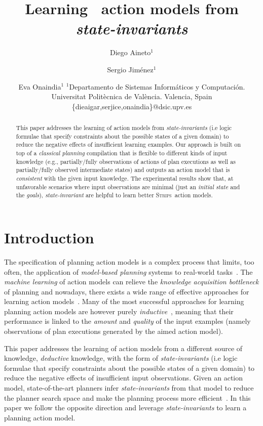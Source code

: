 \documentclass{article}
\title{Learning \strips\ action models from {\em state-invariants}}
\author{
Diego Aineto$^1$\and
Sergio Jim\'enez$^1$\and
Eva Onaindia$^1$
\affiliations
$^1${\small Departamento de Sistemas Inform\'aticos y Computaci\'on. Universitat Polit\`ecnica de Val\`encia. Valencia, Spain}
\emails
{\scriptsize \{dieaigar,serjice,onaindia\}@dsic.upv.es}}
\newcommand{\strips}{\textsc{Strips}}
\begin{document}
\maketitle


\begin{abstract}
This paper addresses the learning of action models from {\em state-invariants} (i.e logic formulae that specify constraints about the possible states of a given domain) to reduce the negative effects of insufficient learning examples. Our approach is built on top of a {\em classical planning} compilation that is flexible to different kinds of input knowledge (e.g., partially/fully observations of actions of plan executions as well as partially/fully observed intermediate states) and outputs an action model that is {\em consistent} with the given input knowledge. The experimental results show that, at unfavorable scenarios where input observations are minimal (just an {\em initial state} and the {\em goals}), {\em state-invariant} are helpful to learn better \strips\ action models.
\end{abstract}

\section{Introduction}
\label{sec:introduction}

The specification of planning action models is a complex process that limits, too often, the application of {\em model-based planning} systems to real-world tasks~\cite{kambhampati:modellite:AAAI2007}. The {\em machine learning} of action models can relieve the {\em knowledge acquisition bottleneck} of planning and nowadays, there exists a wide range of effective approaches for learning action models~\cite{arora:amodels:ker2018}. Many of the most successful approaches for learning planning action models are however purely {\em inductive}~\cite{yang2007learning,pasula2007learning,mourao2010learning,zhuo2013action}, meaning that their performance is linked to the {\em amount} and {\em quality} of the input examples (namely observations of plan executions generated by the aimed action model). 

This paper addresses the learning of action models from a different source of knowledge, {\em deductive} knowledge, with the form of {\em state-invariants} (i.e logic formulae that specify constraints about the possible states of a given domain) to reduce the negative effects of insufficient input observations. Given an action model, state-of-the-art planners infer {\em state-invariants} from that model to reduce the planner search space and make the planning process more efficient~\cite{helmert2009concise}. In this paper we follow the opposite direction and leverage {\em state-invariants} to learn a planning action model.
\end{document}
